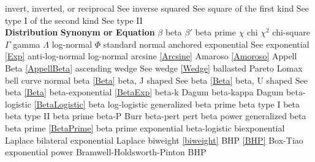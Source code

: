 \noindent
invert, inverted, or reciprocal		\dotfill	See inverse\ncite
squared						\dotfill	See square\ncite
of the first kind					\dotfill	See type I\ncite
of the second kind				\dotfill	See type II\ncite
~\\
\noindent
{\bf Distribution} \hfill {\bf Synonym or Equation}								\ncite
%
$\beta$ 						\dotfill	beta							  	\ncite	%
$\beta'$ 						\dotfill	beta prime						\ncite	%
$\chi$ 						\dotfill	chi								\ncite	%
$\chi^2$ 						\dotfill	chi-square							\ncite 	%
$\Gamma$ 					\dotfill	gamma 							\ncite 	%
$\Lambda$					\dotfill	log-normal 						   	%
$\Phi$						\dotfill	standard normal 					\ncite	%
%
anchored exponential			\dotfill	See exponential \eqref{Exp}			\ncite	%
anti-log-normal 					\dotfill	log-normal 						\ncite	%
arcsine 						\dotfill	\eqref{Arcsine} 					  	\ncite	%
Amaroso						\dotfill	\eqref{Amoroso}					\ncite	%
Appell Beta					\dotfill	\eqref{AppellBeta}					 
ascending wedge				\dotfill	See wedge \eqref{Wedge} 			\ncite	%
%
ballasted Pareto				\dotfill	Lomax							\ncite	%
bell curve 						\dotfill	normal 							\ncite	%
beta 							\dotfill	\eqref{Beta} 						\ncite	%
beta, J shaped					\dotfill	See beta \eqref{Beta} 				\ncite	%
beta, U shaped					\dotfill	See beta \eqref{Beta} 				\ncite	%
beta-exponential				\dotfill	\eqref{BetaExp}						\ncite	%
beta-k						\dotfill	Dagum							%
beta-kappa 					\dotfill	Dagum  							%
beta-logistic					\dotfill	\eqref{BetaLogistic}					\mcite{\self}	%
beta log-logistic					\dotfill	generalized beta prime				\mcite{\self}	%
beta type I 					\dotfill	beta 								\ncite	%
beta type II 					\dotfill	beta prime						\ncite	%
beta-P 						\dotfill	Burr 				 					%
beta-pert						\dotfill	pert 								\ncite	%
beta power					\dotfill	generalized beta					\ncite	%
beta prime 					\dotfill	\eqref{BetaPrime} 					\ncite	%
beta prime exponential			\dotfill	beta-logistic						\mcite{\self} %
biexponential					\dotfill	Laplace							\ncite	%
bilateral exponential  			\dotfill	Laplace 							\ncite	%
biweight						\dotfill	\eqref{biweight}						\ncite
BHP							\dotfill	\eqref{BHP}						\ncite	%
Box-Tiao						\dotfill	exponential power					\ncite
Bramwell-Holdsworth-Pinton 		\dotfill	BHP 								\ncite	%
